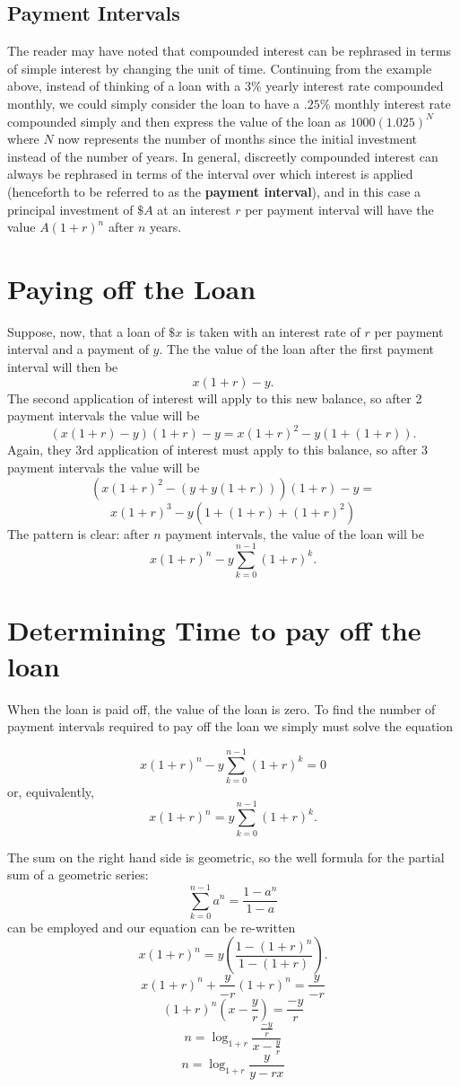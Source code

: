 \documentclass[11pt]{article} %
\begin{document}
\subsection{Payment Intervals}
The reader may have noted that compounded interest can be rephrased in terms of simple interest by changing the unit of time.  Continuing from the example above, instead of thinking of a loan with a $3\%$ yearly interest rate compounded monthly, we could simply consider the loan to have a $.25\%$ monthly interest rate compounded simply and then express the value of the loan as $1000(1.025)^{N}$ where $N$ now represents the number of months since the initial investment instead of the number of years. In general, discreetly compounded interest can always be rephrased in terms of the interval over which interest is applied (henceforth to be referred to as the {\bf payment interval}),  and in this case a principal investment of $\$A$ at an interest $r$ per payment interval will have the value $A(1+r)^n$ after $n$ years.

\section{Paying off the Loan}
Suppose, now, that a loan of $\$x$ is taken with an interest rate of $r$ per payment interval and a payment of $y$. The the value of the loan after the first payment interval will then be 
$$x(1+r) - y.$$
The second application of interest will apply to this new balance, so after 2 payment intervals the value will be 
$$(x(1+r)-y)(1+r) - y = x(1+r)^{2} - y(1 + (1+r)).$$
Again, they 3rd application of interest must apply to this balance, so after 3 payment intervals the value will be
$$\left(x(1+r)^{2} - (y + y(1+r))\right)(1+r) -y =$$
$$ x(1+r)^{3} - y\left(1 + (1+r) + (1+r)^{2}\right)$$
The pattern is clear:  after $n$ payment intervals, the value of the loan will be 
$$x(1+r)^n - y \sum_{k=0}^{n-1} (1+r)^{k}.$$

\section{Determining Time to pay off the loan}
When the loan is paid off, the value of the loan is zero. To find the number of payment intervals required to pay off the loan we simply must solve the equation

$$x(1+r)^n - y \sum_{k=0}^{n-1} (1+r)^{k} = 0$$
or, equivalently, 
$$x(1+r)^n = y \sum_{k=0}^{n-1} (1+r)^{k}.$$

The sum on the right hand side is geometric, so the well formula for the partial sum of a geometric series:
$$\sum_{k=0}^{n-1} a^{n} = \frac{1-a^{n}}{1-a}$$ can be employed and our equation can be re-written
$$x(1+r)^n = y \left(\frac {1 - (1+r)^{n}}{1 - (1+r)} \right).$$
$$x(1+r)^n + \frac{y}{-r}(1+r)^{n} = \frac{y}{-r}$$
$$ (1+r)^{n} (x - \frac{y}{r}) = \frac{-y}{r}$$
$$n = \log_{1+r} \frac{\frac{-y}{r}}{x - \frac{y}{r}}$$
$$n = \log_{1+r} \frac{y}{y - rx}$$
\end{document}
